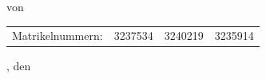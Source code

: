 \begin{titlepage}
\begin{center}
		\textbf{\Large \subjectDocument}

		\vspace*{0.5cm}
		
		{\normalsize von}
		
		\vspace*{0.5cm}
		
		\textbf{\Large \authorDocument}
	
		\vspace*{3.5cm}
		
		\begin{minipage}[t]{13cm}
			\begin{center}
				\begin{tabular}{llll}
					Matrikelnummern: & 3237534 & 3240219 & 3235914 \\
				\end{tabular}
			\end{center}
		\end{minipage}
		
		\vspace*{2.5cm}
	
		{\large \locationDocument, den \dateDocument}
	\end{center}
\end{titlepage}
